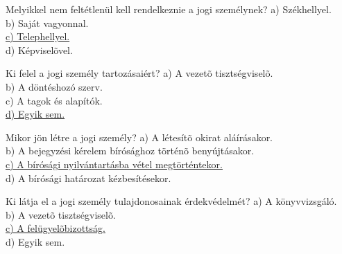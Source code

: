 \begin{frame}

\begin{tcolorbox}[title={48. Kérdés}]
Melyikkel nem feltétlenül kell rendelkeznie a jogi személynek?
\tcblower
a) Székhellyel.\\
b) Saját vagyonnal.\\
\uline {c) Telephellyel.}\\
d) Képviselõvel.
\end{tcolorbox}

\begin{tcolorbox}[title={49. Kérdés}]
Ki felel a jogi személy tartozásaiért?
\tcblower
a) A vezetõ tisztségviselõ.\\
b) A döntéshozó szerv.\\
c) A tagok és alapítók.\\
\uline {d) Egyik sem.}
\end{tcolorbox}

\begin{tcolorbox}[title={50. Kérdés}]
Mikor jön létre a jogi személy?
\tcblower
a) A létesítõ okirat aláírásakor.\\
b) A bejegyzési kérelem bírósághoz történõ benyújtásakor.\\
\uline {c) A bírósági nyilvántartásba vétel megtörténtekor.}\\
d) A bírósági határozat kézbesítésekor.
\end{tcolorbox}

\begin{tcolorbox}[title={51. Kérdés}]
Ki látja el a jogi személy tulajdonosainak érdekvédelmét?
\tcblower
a) A könyvvizsgáló.\\
b) A vezetõ tisztségviselõ.\\
\uline {c) A felügyelõbizottság.}\\
d) Egyik sem.
\end{tcolorbox}

\end{frame}


